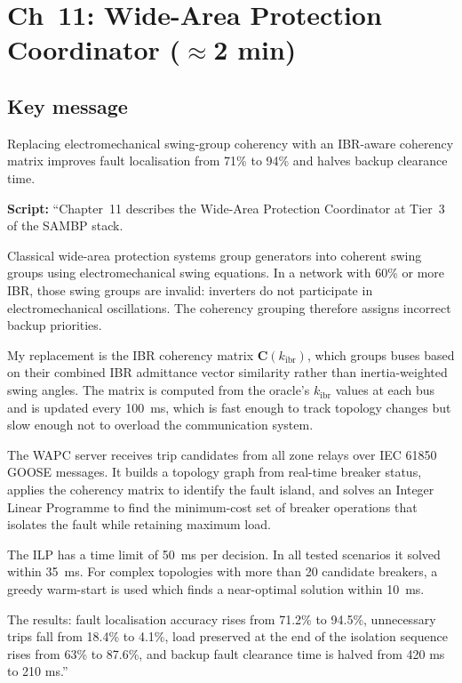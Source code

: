 \documentclass[11pt,a4paper]{article}
\newcommand{\script}[1]{\begin{scriptbox}\textbf{Script:} #1\end{scriptbox}}
\newcommand{\kibr}{k_{\mathrm{ibr}}}
\begin{document}
\section{Ch~11: Wide-Area Protection Coordinator \hfill\normalfont\small($\approx$2 min)}
\label{slide:wapc}

\subsection*{Key message}
Replacing electromechanical swing-group coherency with an IBR-aware coherency matrix
improves fault localisation from 71\% to 94\% and halves backup clearance time.

\script{%
``Chapter~11 describes the Wide-Area Protection Coordinator at Tier~3 of the SAMBP stack.

Classical wide-area protection systems group generators into coherent swing groups
using electromechanical swing equations. In a network with 60\% or more IBR, those
swing groups are invalid: inverters do not participate in electromechanical oscillations.
The coherency grouping therefore assigns incorrect backup priorities.

My replacement is the IBR coherency matrix $\mathbf{C}(\kibr)$, which groups buses based
on their combined IBR admittance vector similarity rather than inertia-weighted swing
angles. The matrix is computed from the oracle's $\hat{\kibr}$ values at each bus and
is updated every 100~ms, which is fast enough to track topology changes but slow enough
not to overload the communication system.

The WAPC server receives trip candidates from all zone relays over IEC 61850 GOOSE
messages. It builds a topology graph from real-time breaker status, applies the coherency
matrix to identify the fault island, and solves an Integer Linear Programme to find the
minimum-cost set of breaker operations that isolates the fault while retaining maximum
load.

The ILP has a time limit of 50~ms per decision. In all tested scenarios it solved within
35~ms. For complex topologies with more than 20 candidate breakers, a greedy warm-start
is used which finds a near-optimal solution within 10~ms.

The results: fault localisation accuracy rises from 71.2\% to 94.5\%, unnecessary trips
fall from 18.4\% to 4.1\%, load preserved at the end of the isolation sequence rises
from 63\% to 87.6\%, and backup fault clearance time is halved from 420 ms to 210 ms.''%
}
\end{document}
